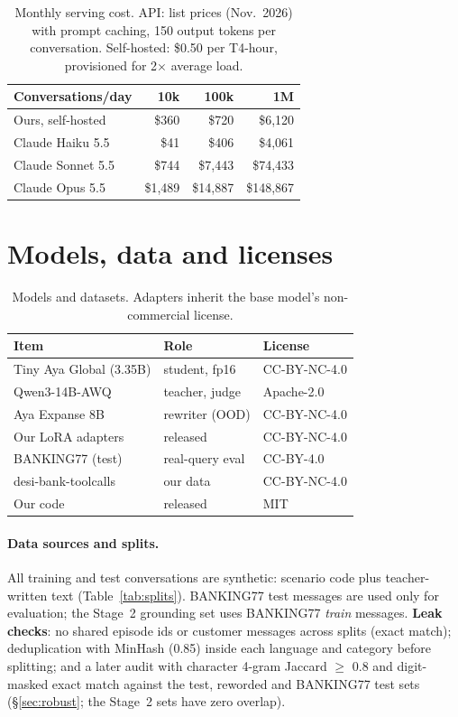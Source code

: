 \documentclass[11pt]{article}
\begin{document}
\begin{table}[h]
\centering
\small
\setlength{\tabcolsep}{3pt}
\begin{tabular}{lrrr}
\toprule
Conversations/day & 10k & 100k & 1M \\
\midrule
Ours, self-hosted & \$360 & \$720 & \$6,120 \\
Claude Haiku 5.5 & \$41 & \$406 & \$4,061 \\
Claude Sonnet 5.5 & \$744 & \$7,443 & \$74,433 \\
Claude Opus 5.5 & \$1,489 & \$14,887 & \$148,867 \\
\bottomrule
\end{tabular}
\caption{Monthly serving cost. API: list prices (Nov.\ 2026) with prompt caching, 150 output tokens per
conversation. Self-hosted: \$0.50 per T4-hour, provisioned for 2$\times$ average load.}
\label{tab:cost}
\end{table}



\section{Models, data and licenses}
\label{app:licenses}

\begin{table}[h]
\centering
\small
\setlength{\tabcolsep}{3pt}
\begin{tabular}{lll}
\toprule
Item & Role & License \\
\midrule
Tiny Aya Global (3.35B) & student, fp16 & CC-BY-NC-4.0 \\
Qwen3-14B-AWQ & teacher, judge & Apache-2.0 \\
Aya Expanse 8B & rewriter (OOD) & CC-BY-NC-4.0 \\
Our LoRA adapters & released & CC-BY-NC-4.0 \\
BANKING77 (test) & real-query eval & CC-BY-4.0 \\
desi-bank-toolcalls & our data & CC-BY-NC-4.0 \\
Our code & released & MIT \\
\bottomrule
\end{tabular}
\caption{Models and datasets. Adapters inherit the base model's non-commercial license.}
\end{table}

\paragraph{Data sources and splits.} All training and test conversations are synthetic: scenario code plus
teacher-written text (Table~\ref{tab:splits}). BANKING77 test messages are used only for evaluation; the Stage~2
grounding set uses BANKING77 \emph{train} messages. \textbf{Leak checks}: no shared episode ids or customer messages
across splits (exact match); deduplication with MinHash (0.85) inside each language and category before splitting;
and a later audit with character 4-gram Jaccard $\geq$ 0.8 and digit-masked exact match against the test, reworded and
BANKING77 test sets (\S\ref{sec:robust}; the Stage~2 sets have zero overlap).
\end{document}
